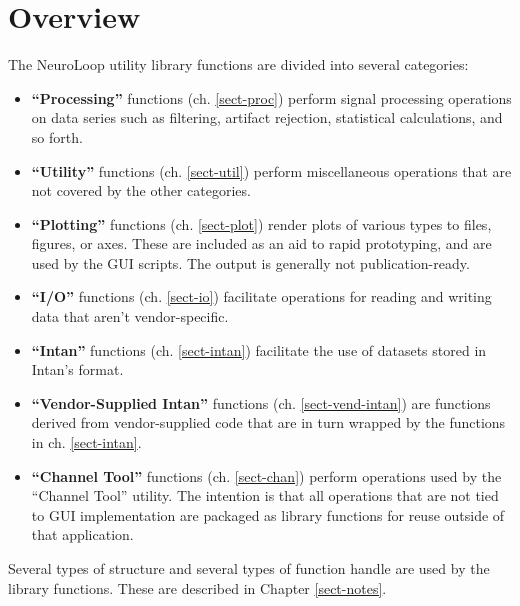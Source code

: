 
\chapter{Overview}
\label{sect-over}

The NeuroLoop utility library functions are divided into several categories:

\begin{itemize}

\item \textbf{``Processing''} functions (ch. \ref{sect-proc}) perform signal
processing operations on data series such as filtering, artifact rejection,
statistical calculations, and so forth.

\item \textbf{``Utility''} functions (ch. \ref{sect-util}) perform
miscellaneous operations that are not covered by the other categories.

\item \textbf{``Plotting''} functions (ch. \ref{sect-plot}) render plots
of various types to files, figures, or axes. These are included as an aid
to rapid prototyping, and are used by the GUI scripts. The output is
generally not publication-ready.

\item \textbf{``I/O''} functions (ch. \ref{sect-io}) facilitate operations
for reading and writing data that aren't vendor-specific.

\item \textbf{``Intan''} functions (ch. \ref{sect-intan}) facilitate the use
of datasets stored in Intan's format.

\item \textbf{``Vendor-Supplied Intan''} functions
(ch. \ref{sect-vend-intan}) are functions derived from vendor-supplied code
that are in turn wrapped by the functions in ch. \ref{sect-intan}.

\item \textbf{``Channel Tool''} functions (ch. \ref{sect-chan}) perform
operations used by the ``Channel Tool'' utility. The intention is that all
operations that are not tied to GUI implementation are packaged as library
functions for reuse outside of that application.

\end{itemize}

Several types of structure and several types of function handle are used by
the library functions. These are described in Chapter \ref{sect-notes}.

%
